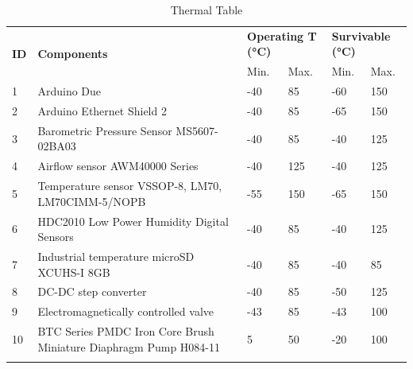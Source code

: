\documentclass[a4paper,12pt,twoside]{article}
\begin{document}
\begin{longtable}{|m{1cm}|m{3.5cm}|m{1cm}|m{1cm}|m{1cm}|m{1cm}|}
\hline
\multirow{2}{*}{\textbf{ID}} & \multirow{2}{*}{\textbf{Components}}                                 & \multicolumn{2}{l|}{\textbf{Operating T (°C)}} & \multicolumn{2}{l|}{\textbf{Survivable (°C)}} \\ \cline{3-6} 
                             &                                                                      & Min.                   & Max.                  & Min.                  & Max.                  \\ \hline
1                            & Arduino Due                                                          & -40                    & 85                    & -60                   & 150                   \\ \hline
2                            & Arduino Ethernet Shield 2                                            & -40                    & 85                    & -65                   & 150                   \\ \hline
3                            & Barometric Pressure Sensor MS5607-02BA03                             & -40                    & 85                    & -40                   & 125                   \\ \hline
4                            & Airflow sensor AWM40000 Series                                       & -40                    & 125                   & -40                   & 125                   \\ \hline
5                            & Temperature sensor VSSOP-8, LM70, LM70CIMM-5/NOPB & -55                    & 150                   & -65                   & 150                   \\ \hline
6                           & HDC2010 Low Power Humidity Digital Sensors                           & -40                    & 85                    & -40                   & 125                   \\ \hline
7                            & Industrial temperature microSD XCUHS-I 8GB                           & -40                    & 85                    & -40                   & 85                    \\ \hline
8                            & DC-DC step converter                                                 & -40                       & 85                       & -50                      & 125                      \\ \hline
9                           & Electromagnetically controlled valve                                 &  -43                      & 85              & -43                      & 100                      \\ \hline
10                           & BTC Series PMDC Iron Core Brush Miniature Diaphragm Pump H084-11                                                            & 5                      & 50                      & -20                    & 100                      \\ \hline

\caption{Thermal Table}
\label{tab:thermal-table}
\end{longtable}
\raggedbottom
\end{document}
